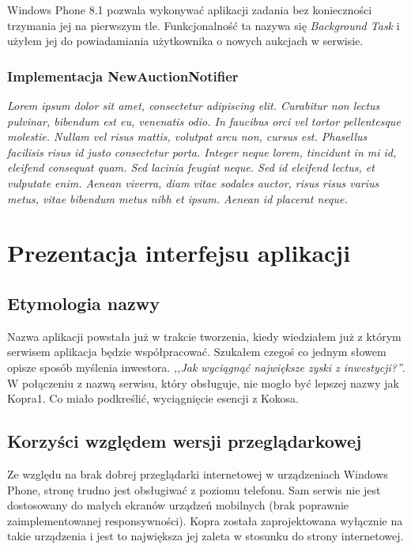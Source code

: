 \documentclass[a4paper,twoside,titlepage,openright]{book}
\begin{document}
Windows Phone 8.1 pozwala wykonywać aplikacji zadania bez konieczności trzymania jej na pierwszym tle. Funkcjonalność ta nazywa się \textit{Background Task} i użyłem jej do powiadamiania użytkownika o nowych aukcjach w serwisie.

\subsection{Implementacja NewAuctionNotifier}

{\color{red}\textit{Lorem ipsum dolor sit amet, consectetur adipiscing elit. Curabitur non lectus pulvinar, bibendum est eu, venenatis odio. In faucibus orci vel tortor pellentesque molestie. Nullam vel risus mattis, volutpat arcu non, cursus est. Phasellus facilisis risus id justo consectetur porta. Integer neque lorem, tincidunt in mi id, eleifend consequat quam. Sed lacinia feugiat neque. Sed id eleifend lectus, et vulputate enim. Aenean viverra, diam vitae sodales auctor, risus risus varius metus, vitae bibendum metus nibh et ipsum. Aenean id placerat neque. }}





\chapter{Prezentacja interfejsu aplikacji}

\section{Etymologia nazwy}

Nazwa aplikacji powstała już w trakcie tworzenia, kiedy wiedziałem już z którym serwisem aplikacja będzie współpracować. Szukałem czegoś co jednym słowem opisze sposób myślenia inwestora. \textit{,,Jak wyciągnąć największe zyski z inwestycji?''}. W połączeniu z nazwą serwisu, który obsługuje, nie mogło być lepszej nazwy jak Kopra1. Co miało podkreślić, wyciągnięcie esencji z Kokosa.

\section{Korzyści względem wersji przeglądarkowej}

Ze względu na brak dobrej przeglądarki internetowej w urządzeniach Windows Phone, stronę trudno jest obsługiwać z poziomu telefonu. Sam serwis nie jest dostosowany do małych ekranów urządzeń mobilnych (brak poprawnie zaimplementowanej responsywności). Kopra została zaprojektowana wyłącznie na takie urządzenia i jest to największa jej zaleta w stosunku do strony internetowej. 
\end{document}

